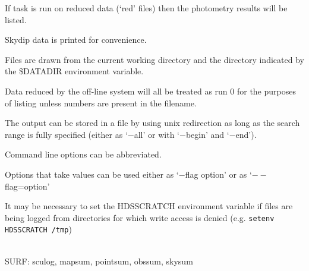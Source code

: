 \documentclass[twoside,11pt]{article}
\newcommand{\task}[1]{{\sf #1}}
\newcommand{\sculog}{\htmlref{\task{sculog}}{SCULOG}}
\newcommand{\mapsum}{\htmlref{\task{mapsum}}{MAPSUM}}
\newcommand{\skysum}{\htmlref{\task{skysum}}{SKYSUM}}
\newcommand{\pointsum}{\htmlref{\task{pointsum}}{POINTSUM}}
\newcommand{\obssum}{\htmlref{\task{obssum}}{OBSSUM}}
\newcommand{\htmlref}[2]{#1}
\renewcommand{\_}{\texttt{\symbol{95}}}
\newcommand{\sstdiytopic}[2]{\item[{\hspace{-0.35em}#1\hspace{-0.35em}:}]
\mbox{} \\[1.3ex] #2}
\newcommand{\sstitem}{\item}
\newcommand{\sstdiytopic}[2]{\item[{#1}] #2 }
\newcommand{\sstitem}{\item}
\begin{document}
{{{         \sstitem
         If task is run on reduced data (`\_red\_' files) then the photometry results
         will be listed.

         \sstitem
         Skydip data is printed for convenience.

         \sstitem
         Files are drawn from the current working directory and the directory
           indicated by the \$DATADIR environment variable.   %

         \sstitem
         Data reduced by the off-line system will all be treated as
           run 0 for the purposes of listing unless numbers are present
           in the filename.

         \sstitem
         The output can be stored in a file by using unix redirection as
           long as the search range is fully specified (either as `$-$all' or
           with `$-$begin' and `$-$end').

         \sstitem
         Command line options can be abbreviated.

         \sstitem
         Options that take values can be used either as `$-$flag option' or
         as `$--$flag=option'

         \sstitem
         It may be necessary to set the HDS\_SCRATCH environment variable if 
  files are being logged from directories for which write access is
  denied (e.g. \texttt{setenv HDS\_SCRATCH /tmp})


      }
   }
   \sstdiytopic{
      Related Applications
   }{
      SURF: \sculog, \mapsum, \pointsum, \obssum, \skysum
   }
}
\end{document}
